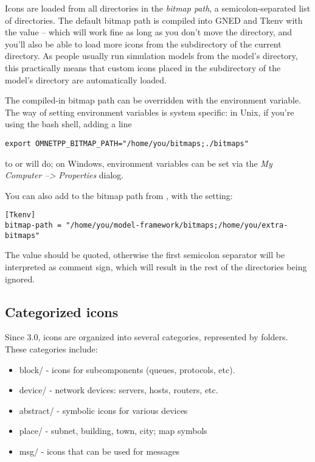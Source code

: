 Icons are loaded from all directories in the \textit{bitmap path},
a semicolon-separated list of directories.
The default bitmap path is compiled into GNED and Tkenv with the value
 -- which will work fine
as long as you don't move the directory, and you'll also be able to
load more icons from the  subdirectory of the current
directory. As people usually run simulation models from the model's
directory, this practically means that custom icons placed in the
 subdirectory of the model's directory are automatically
loaded.

The compiled-in bitmap path can be overridden with the 
environment variable. The way of setting environment variables is system
specific: in Unix, if you're using the bash shell, adding a line

\begin{verbatim}
export OMNETPP_BITMAP_PATH="/home/you/bitmaps;./bitmaps"
\end{verbatim}

to  or  will do; on Windows, environment variables
can be set via the \textit{My Computer --> Properties} dialog.

You can also add to the bitmap path from , with
the  setting:

\begin{verbatim}
[Tkenv]
bitmap-path = "/home/you/model-framework/bitmaps;/home/you/extra-bitmaps"
\end{verbatim}

The value should be quoted, otherwise the first semicolon separator will be
interpreted as comment sign, which will result in the rest of the
directories being ignored.


\subsection{Categorized icons}

Since {\opp} 3.0, icons are organized into several categories, represented
by folders. These categories include:

\begin{itemize}
  \item block/ - icons for subcomponents (queues, protocols, etc).
  \item device/ - network devices: servers, hosts, routers, etc.
  \item abstract/ - symbolic icons for various devices
  \item place/ - subnet, building, town, city; map symbols
  \item msg/ - icons that can be used for messages
\end{itemize}

